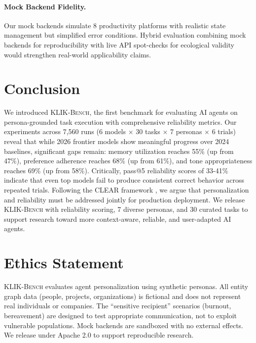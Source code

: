 \documentclass{article}
\newcommand{\klikbench}{\textsc{KLIK-Bench}}
\begin{document}
\paragraph{Mock Backend Fidelity.} Our mock backends simulate 8 productivity platforms with realistic state management but simplified error conditions. Hybrid evaluation combining mock backends for reproducibility with live API spot-checks for ecological validity would strengthen real-world applicability claims.

\section{Conclusion}
\label{sec:conclusion}

We introduced \klikbench{}, the first benchmark for evaluating AI agents on persona-grounded task execution with comprehensive reliability metrics. Our experiments across 7,560 runs (6 models $\times$ 30 tasks $\times$ 7 personas $\times$ 6 trials) reveal that while 2026 frontier models show meaningful progress over 2024 baselines, significant gaps remain: memory utilization reaches 55\% (up from 47\%), preference adherence reaches 68\% (up from 61\%), and tone appropriateness reaches 69\% (up from 58\%). Critically, pass@5 reliability scores of 33-41\% indicate that even top models fail to produce consistent correct behavior across repeated trials. Following the CLEAR framework \citep{clearframework2026}, we argue that personalization and reliability must be addressed jointly for production deployment. We release \klikbench{} with reliability scoring, 7 diverse personas, and 30 curated tasks to support research toward more context-aware, reliable, and user-adapted AI agents.

\section*{Ethics Statement}

\klikbench{} evaluates agent personalization using synthetic personas. All entity graph data (people, projects, organizations) is fictional and does not represent real individuals or companies. The ``sensitive recipient'' scenarios (burnout, bereavement) are designed to test appropriate communication, not to exploit vulnerable populations. Mock backends are sandboxed with no external effects. We release under Apache 2.0 to support reproducible research.



\end{document}
